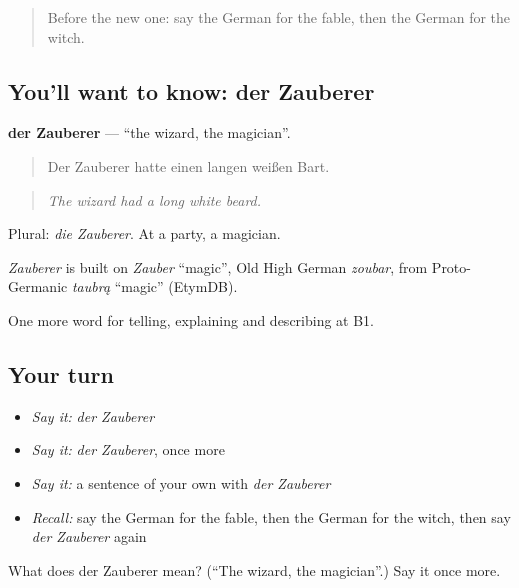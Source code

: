 \label{lesson:GE-C313-zauberer}



\begin{quote}
Before the new one: say the German for the fable, then the German for the witch.
\end{quote}

\subsection*{You'll want to know: der Zauberer}
\textbf{der Zauberer} — \textquotedblleft{}the wizard, the magician\textquotedblright{}.

\begin{quote}
Der Zauberer hatte einen langen weißen Bart.
\end{quote}

\begin{quote}
\emph{The wizard had a long white beard.}
\end{quote}

Plural: \emph{die Zauberer}. At a party, a magician.

\begin{cousinweb}
\emph{Zauberer} is built on \emph{Zauber} \textquotedblleft{}magic\textquotedblright{}, Old High German \emph{zoubar}, from Proto-Germanic \emph{taubrą} \textquotedblleft{}magic\textquotedblright{} (EtymDB).
\end{cousinweb}

\begin{grammarlens}[title={What you've built}]
One more word for telling, explaining and describing at B1.
\end{grammarlens}

\subsection*{Your turn}
\begin{itemize}
\raggedright
  \item \emph{Say it:} \emph{der Zauberer}
  \item \emph{Say it:} \emph{der Zauberer}, once more
  \item \emph{Say it:} a sentence of your own with \emph{der Zauberer}
  \item \emph{Recall:} say the German for the fable, then the German for the witch, then say \emph{der Zauberer} again
\end{itemize}

\begin{tcolorbox}[breakable,colback=teal!4,colframe=teal!35!black,title={Before you move on}]
What does der Zauberer mean? (\textquotedblleft{}The wizard, the magician\textquotedblright{}.) Say it once more.
\end{tcolorbox}
